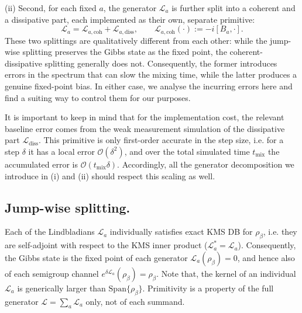 (ii) Second, for each fixed $a$, the generator $\mathcal{L}_a$ is further split into a coherent and a dissipative part, each implemented as their own, separate primitive:
$$
 \mathcal L_a = \mathcal L_{a,\mathrm{coh}} + \mathcal L_{a,\mathrm{diss}},
    \qquad
    \mathcal L_{a,\mathrm{coh}}(\cdot) := - i [B_a,\cdot].
$$
These two splittings are qualitatively different from each other: while the jump-wise splitting preserves the Gibbs state as the fixed point, the coherent-dissipative splitting generally does not. Consequently, the former introduces errors in the spectrum that can slow the mixing time, while the latter produces a genuine fixed-point bias. In either case, we analyse the incurring errors here and find a suiting way to control them for our purposes.

It is important to keep in mind that for the implementation cost, the relevant baseline error comes from the weak measurement simulation of the dissipative part $\mathcal{L}_\mathrm{diss}$. This primitive is only first-order accurate in the step size, i.e. for a step $\delta$ it has a local error $\mathcal{O}(\delta^2)$, and over the total simulated time $t_\text{mix}$ the accumulated error is $\mathcal{O}(t_\text{mix} \delta)$. Accordingly, all the generator decomposition we introduce in (i) and (ii) should respect this scaling as well.

\medskip
\label{sec:ckg-jumpwise-split}
\subsection{Jump-wise splitting.} Each of the Lindbladians $\mathcal{L}_a$ individually satisfies exact KMS DB for $\rho_\beta$, i.e. they are self-adjoint with respect to the KMS inner product ($\mathcal{L}_a^* = \mathcal{L}_a$). Consequently, the Gibbs state is the fixed point of each generator $\mathcal{L}_a(\rho_\beta) = 0$, and hence also of each semigroup channel $e^{\delta\mathcal{L}_a}(\rho_\beta) = \rho_\beta$. Note that, the kernel of an individual $\mathcal{L}_a$ is generically larger than $\mathrm{Span}\{\rho_\beta\}$. Primitivity is a property of the full generator $\mathcal{L} = \sum_a \mathcal{L}_a$ only, not of each summand.

